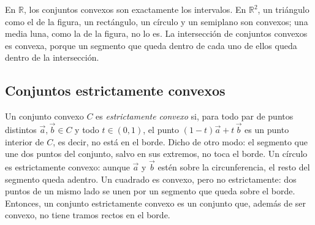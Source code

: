 \documentclass{article}
\newcommand{\R}{\ensuremath{\mathbb{R}}}
\newcommand{\vect}[1]{\vec{#1}}
\begin{document}
\begin{center}
\hspace{1.2cm}
\end{center}

En \(\R\), los conjuntos convexos son exactamente los intervalos. En \(\R^2\), un triángulo como el de la figura, un rectángulo, un círculo y un semiplano son convexos; una media luna, como la de la figura, no lo es. La intersección de conjuntos convexos es convexa, porque un segmento que queda dentro de cada uno de ellos queda dentro de la intersección.

\subsection*{Conjuntos estrictamente convexos}

Un conjunto convexo \(C\) es \emph{estrictamente convexo} si, para todo par de puntos distintos \(\vect{a},\vect{b}\in C\) y todo \(t\in(0,1)\), el punto \((1-t)\vect{a}+t\,\vect{b}\) es un punto interior de \(C\), es decir, no está en el borde. Dicho de otro modo: el segmento que une dos puntos del conjunto, salvo en sus extremos, no toca el borde. Un círculo es estrictamente convexo: aunque \(\vect{a}\) y \(\vect{b}\) estén sobre la circunferencia, el resto del segmento queda adentro. Un cuadrado es convexo, pero no estrictamente: dos puntos de un mismo lado se unen por un segmento que queda sobre el borde. Entonces, un conjunto estrictamente convexo es un conjunto que, además de ser convexo, no tiene tramos rectos en el borde.
\end{document}
